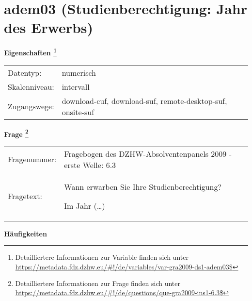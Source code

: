
    \setcounter{footnote}{0}

    \vspace*{-1.8cm}
	\section{adem03 (Studienberechtigung: Jahr des Erwerbs)}
	\label{section:adem03}



    \vspace*{0.5cm}
    \noindent\textbf{Eigenschaften
	\footnote{Detailliertere Informationen zur Variable finden sich unter
		\url{https://metadata.fdz.dzhw.eu/\#!/de/variables/var-gra2009-ds1-adem03$}}}\\
	\begin{tabularx}{\hsize}{@{}lX}
	Datentyp: & numerisch \\
	Skalenniveau: & intervall \\
	Zugangswege: &
	  download-cuf, 
	  download-suf, 
	  remote-desktop-suf, 
	  onsite-suf
 \\
    \end{tabularx}



				\vspace*{0.5cm}
                \noindent\textbf{Frage
	                \footnote{Detailliertere Informationen zur Frage finden sich unter
		              \url{https://metadata.fdz.dzhw.eu/\#!/de/questions/que-gra2009-ins1-6.3$}}}\\
				\begin{tabularx}{\hsize}{@{}lX}
					Fragenummer: &
					  Fragebogen des DZHW-Absolventenpanels 2009 - erste Welle:
					  6.3
 \\
					Fragetext: & Wann erwarben Sie Ihre Studienberechtigung?\par  Im Jahr (…) \\
				\end{tabularx}





        		\vspace*{0.5cm}
                \noindent\textbf{Häufigkeiten}

